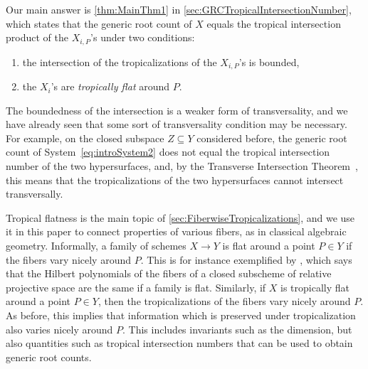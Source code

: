 \documentclass[12pt,reqno,a4paper]{amsart}
\theoremstyle{theoremstyle}
\theoremstyle{examplestyle}
\theoremstyle{algorithmstyle}
\begin{document}
Our main answer is \cref{thm:MainThm1} in \cref{sec:GRCTropicalIntersectionNumber}, which states that the generic root count of $X$ equals the tropical intersection product of the $X_{i,P}$'s under two conditions:
\begin{enumerate}
\item the intersection of the tropicalizations of the $X_{i,P}$'s is bounded,
\item the $X_i$'s are \emph{tropically flat} around $P$.
\end{enumerate}
The boundedness of the intersection is a weaker form of transversality, and we have already seen that some sort of transversality condition may be necessary. For example, on the closed subspace $Z\subseteq Y$ considered before, the generic root count of System~\eqref{eq:introSystem2} does not equal the tropical intersection number of the two hypersurfaces, and, by the Transverse Intersection Theorem~\cite[Theorem~3.4.12]{MS15}, this means that the tropicalizations of the two hypersurfaces cannot intersect transversally.


Tropical flatness is the main topic of \cref{sec:FiberwiseTropicalizations}, and we use it in this paper to connect properties of various fibers, as in classical algebraic geometry. %
Informally, a family of schemes $X\to Y$ is flat around a point $P\in Y$ if the fibers vary nicely around $P$.  This is for instance exemplified by \cite[Chapter III, Corollary 9.10]{Hartshorne1977}, which says that the Hilbert polynomials of the fibers of a closed subscheme of relative projective space are the same if a family is flat. Similarly, if $X$ is tropically flat around a point $P\in Y$, then the tropicalizations of the fibers %
vary nicely around $P$.  As before, this implies that information which is preserved under tropicalization also varies nicely around $P$. This includes invariants such as the dimension, but also quantities such as tropical intersection numbers that can be used to obtain generic root counts. 
\end{document}
